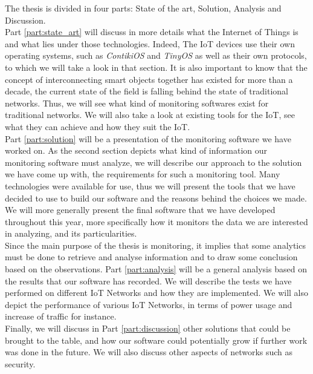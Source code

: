 The thesis is divided in four parts: State of the art, Solution, Analysis and Discussion.\\

Part \ref{part:state_art} will discuss in more details what the Internet of Things is and what lies under those technologies. Indeed, The IoT devices use their own operating systems, such as \textit{ContikiOS} and \textit{TinyOS} as well as their own protocols, to which we will take a look in that section. It is also important to know that the concept of interconnecting smart objects together has existed for more than a decade, the current state of the field is falling behind the state of traditional networks. Thus, we will see what kind of monitoring softwares exist for traditional networks. We will also take a look at existing tools for the IoT, see what they can achieve and how they suit the IoT.\\

Part \ref{part:solution} will be a presentation of the monitoring software we have worked on. As the second section depicts what kind of information our monitoring software must analyze, we will describe our approach to the solution we have come up with, the requirements for such a monitoring tool. Many technologies were available for use, thus we will present the tools that we have decided to use to build our software and the reasons behind the choices we made. We will more generally present the final software that we have developed throughout this year, more specifically how it monitors the data we are interested in analyzing, and its particularities. \\

Since the main purpose of the thesis is monitoring, it implies that some analytics must be done to retrieve and analyse information and to draw some conclusion based on the observations. Part \ref{part:analysis} will be a general analysis based on the results that our software has recorded. We will describe the tests we have performed on different IoT Networks and how they are implemented. We will also depict the performance of various IoT Networks, in terms of power usage and increase of traffic for instance.\\

Finally, we will discuss in Part \ref{part:discussion} other solutions that could be brought to the table, and how our software could potentially grow if further work was done in the future. We will also discuss other aspects of networks such as security.
